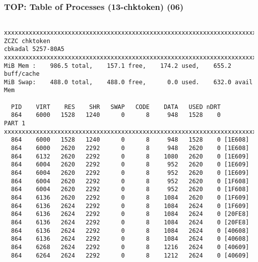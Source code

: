 \documentclass[aspectratio=169, xcolor=table, notheorems, hyperref={pdfpagelabels=false}]{beamer}
\begin{document}
\begin{frame}[fragile]
\frametitle{TOP: Table of Processes (13-chktoken) (06)}
\begin{lstlisting}[basicstyle=\ttfamily\tiny]

xxxxxxxxxxxxxxxxxxxxxxxxxxxxxxxxxxxxxxxxxxxxxxxxxxxxxxxxxxxxxxxxxxxxxxxxxxx
ZCZC chktoken
cbkadal 5257-80A5
xxxxxxxxxxxxxxxxxxxxxxxxxxxxxxxxxxxxxxxxxxxxxxxxxxxxxxxxxxxxxxxxxxxxxxxxxxx
MiB Mem :    986.5 total,    157.1 free,    174.2 used,    655.2 buff/cache
MiB Swap:    488.0 total,    488.0 free,      0.0 used.    632.0 avail Mem 

  PID    VIRT    RES    SHR   SWAP   CODE    DATA   USED nDRT
  864    6000   1528   1240      0      8     948   1528    0
PART 1
xxxxxxxxxxxxxxxxxxxxxxxxxxxxxxxxxxxxxxxxxxxxxxxxxxxxxxxxxxxxxxxxxxxxxxxxxxx
  864    6000   1528   1240      0      8     948   1528    0 [1E608]
  864    6000   2620   2292      0      8     948   2620    0 [1E608]
  864    6132   2620   2292      0      8    1080   2620    0 [1E609]
  864    6004   2620   2292      0      8     952   2620    0 [1E609]
  864    6004   2620   2292      0      8     952   2620    0 [1E609]
  864    6004   2620   2292      0      8     952   2620    0 [1F608]
  864    6004   2620   2292      0      8     952   2620    0 [1F608]
  864    6136   2620   2292      0      8    1084   2620    0 [1F609]
  864    6136   2624   2292      0      8    1084   2624    0 [1F609]
  864    6136   2624   2292      0      8    1084   2624    0 [20FE8]
  864    6136   2624   2292      0      8    1084   2624    0 [20FE8]
  864    6136   2624   2292      0      8    1084   2624    0 [40608]
  864    6136   2624   2292      0      8    1084   2624    0 [40608]
  864    6268   2624   2292      0      8    1216   2624    0 [40609]
  864    6264   2624   2292      0      8    1212   2624    0 [40609]

\end{lstlisting}
\end{frame}
\end{document}
